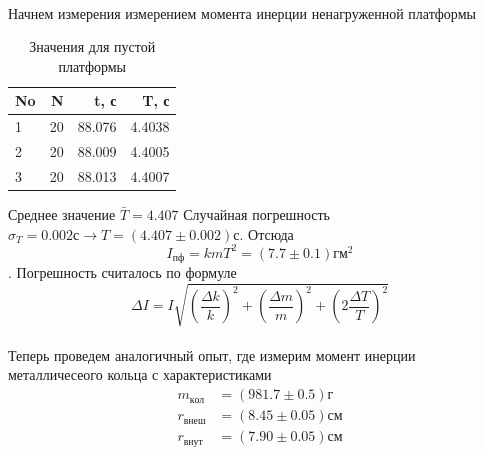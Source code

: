 \documentclass[a4paper, 12pt]{article}
\begin{document}
    \newpage
    \paragraph{}
    Начнем измерения измерением момента инерции ненагруженной платформы

    \begin{table}[h!]
    \begin{center}
    \begin{tabular}{|l|r|r|r|}
    \hline
    No &   N &       t, с &         T, с \\
    \hline
    1  &  20 &  88.076 &  4.4038 \\
    2  &  20 &  88.009 &  4.4005 \\
    3  &  20 &  88.013 &  4.4007 \\
    \hline
    \end{tabular}
    \end{center}
    \caption{Значения для пустой платформы}

    \end{table}
    Среднее значение $\bar T=4.407$ Случайная погрешность
    $\sigma_T = 0.002с \rightarrow T=(4.407 \pm 0.002)с$. Отсюда \[I_{пф}=kmT^2=(7.7\pm0.1)гм^2\]. Погрешность считалось по формуле
    \[\Delta I = I\sqrt{\left(\frac{\Delta k}{k}\right)^2 +
                     \left(\frac{\Delta m}{m}\right)^2 +
                     \left(2\frac{\Delta T}{T}\right)^2}\]

    \paragraph{}
    Теперь проведем аналогичный опыт, где измерим момент инерции металличесеого кольца
    с характеристиками
    \begin{align*}
    m_{кол} &= (981.7 \pm 0.5) г \\
    r_{внеш} &= (8.45 \pm 0.05) см \\
    r_{внут} &= (7.90 \pm 0.05) см
    \end{align*}
\end{document}
